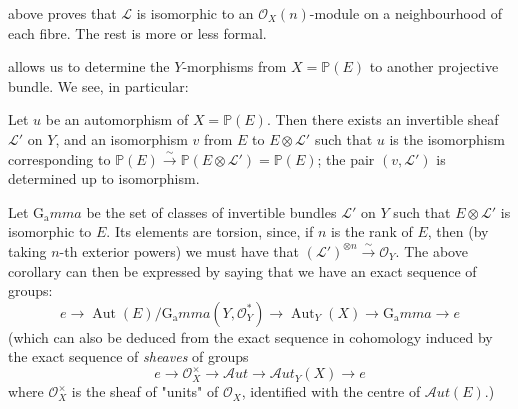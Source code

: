 \begin{cproof}
     above proves that $\mathcal{L}$ is isomorphic to an $\mathcal{O}_X(n)$-module on a neighbourhood of each fibre.
    The rest is more or less formal.
\end{cproof}


 allows us to determine the $Y$-morphisms from $X=\mathbb{P}(E)$ to another projective bundle.
We see, in particular:

\begin{corollary}\label{fga2-proposition-2-corollary-1}
    Let $u$ be an automorphism of $X=\mathbb{P}(E)$.
    Then there exists an invertible sheaf $\mathcal{L}'$ on $Y$, and an isomorphism $v$ from $E$ to $E\otimes\mathcal{L}'$ such that $u$ is the isomorphism corresponding to $\mathbb{P}(E)\xrightarrow{\sim}\mathbb{P}(E\otimes\mathcal{L}')=\mathbb{P}(E)$;
    the pair $(v,\mathcal{L}')$ is determined up to isomorphism.
\end{corollary}

Let $\operatorname{G_a}mma$ be the set of classes of invertible bundles $\mathcal{L}'$ on $Y$ such that $E\otimes\mathcal{L}'$ is isomorphic to $E$.
Its elements are torsion, since, if $n$ is the rank of $E$, then (by taking $n$-th exterior powers) we must have that $(\mathcal{L}')^{\otimes n}\xrightarrow{\sim}\mathcal{O}_Y$.
The above corollary can then be expressed by saying that we have an exact sequence of groups:
\[e \to \operatorname{Aut}(E)/\operatorname{G_a}mma(Y,\mathcal{O}_Y^*) \to \operatorname{Aut}_Y(X) \to \operatorname{G_a}mma \to e\]
(which can also be deduced from the exact sequence in cohomology induced by the exact sequence of \emph{sheaves} of groups
\[e \to \mathcal{O}_X^\times \to \mathcal{A}ut \to \mathcal{A}ut_Y(X) \to e\]
where $\mathcal{O}_X^\times$ is the sheaf of "units" of $\mathcal{O}_X$, identified with the centre of $\mathcal{A}ut(E)$.)
